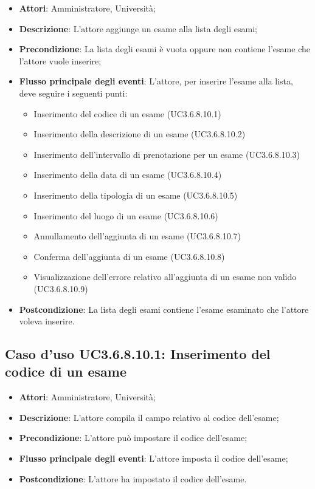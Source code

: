 \begin{itemize}
\item \textbf{Attori}: Amministratore, Università;
\item \textbf{Descrizione}: L'attore aggiunge un esame alla lista degli esami;

\item \textbf{Precondizione}: La lista degli esami è vuota oppure non contiene l'esame che l'attore vuole inserire;

\item \textbf{Flusso principale degli eventi}: L'attore, per inserire l'esame alla lista, deve seguire i seguenti punti:

\begin{itemize}
\item Inserimento del codice di un esame (UC3.6.8.10.1)
\item Inserimento della descrizione di un esame (UC3.6.8.10.2)
\item Inserimento dell’intervallo di prenotazione per un esame (UC3.6.8.10.3)
\item Inserimento della data di un esame (UC3.6.8.10.4)
\item Inserimento della tipologia di un esame (UC3.6.8.10.5)
\item Inserimento del luogo di un esame (UC3.6.8.10.6)
\item Annullamento dell’aggiunta di un esame (UC3.6.8.10.7)
\item Conferma dell’aggiunta di un esame (UC3.6.8.10.8)
\item Visualizzazione dell'errore relativo all’aggiunta di un esame non valido (UC3.6.8.10.9)
\end{itemize}
\item \textbf{Postcondizione}: La lista degli esami contiene l'esame esaminato che l'attore voleva inserire.

\end{itemize}
\subsection{Caso d'uso \texorpdfstring{UC3.6.8.10.1}{UC3.6.8.10.1}: Inserimento del codice di un esame}
\begin{itemize}
\item \textbf{Attori}: Amministratore, Università;
\item \textbf{Descrizione}: L'attore compila il campo relativo al codice dell’esame;

\item \textbf{Precondizione}: L'attore può impostare il codice dell’esame;

\item \textbf{Flusso principale degli eventi}: L'attore imposta il codice dell’esame;

\item \textbf{Postcondizione}: L'attore ha impostato il codice dell’esame.

\end{itemize}
